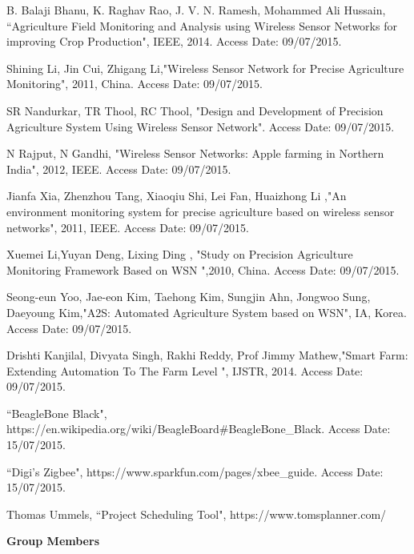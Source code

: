 \documentclass[10pt,a4paper]{article}
\begin{document}
\newpage
\begin{thebibliography}{2}

 B. Balaji Bhanu, K. Raghav Rao, J. V. N. Ramesh, Mohammed Ali Hussain, ``Agriculture Field Monitoring and Analysis using Wireless Sensor Networks for improving Crop Production", IEEE, 2014. Access Date: 09/07/2015.

 Shining Li, Jin Cui,  Zhigang Li,"Wireless Sensor Network for Precise Agriculture Monitoring", 2011, China. Access Date: 09/07/2015.

SR Nandurkar, TR Thool, RC Thool, "Design and Development of Precision Agriculture System Using Wireless Sensor Network". Access Date: 09/07/2015.


N Rajput, N Gandhi, "Wireless Sensor Networks: Apple farming in Northern India", 2012, IEEE. Access Date: 09/07/2015.

Jianfa Xia, Zhenzhou Tang, Xiaoqiu Shi, Lei Fan, Huaizhong Li ,"An environment monitoring system for 
precise agriculture based on wireless sensor networks", 2011, IEEE. Access Date: 09/07/2015.

 Xuemei Li,Yuyan Deng, Lixing Ding , "Study on Precision Agriculture Monitoring Framework Based on WSN 
",2010, China. Access Date: 09/07/2015.

 Seong-eun Yoo, Jae-eon Kim, Taehong Kim, Sungjin Ahn, Jongwoo Sung, Daeyoung Kim,"A2S: Automated 
Agriculture System based on WSN", IA, Korea. Access Date: 09/07/2015.

 Drishti Kanjilal, Divyata Singh, Rakhi Reddy, Prof Jimmy Mathew,"Smart Farm: Extending Automation To 
The Farm Level ", IJSTR, 2014. Access Date: 09/07/2015.

 ``BeagleBone Black", https://en.wikipedia.org/wiki/BeagleBoard\#BeagleBone\_Black. Access Date: 15/07/2015.

 ``Digi's Zigbee", https://www.sparkfun.com/pages/xbee\_guide. Access Date: 15/07/2015.

 Thomas Ummels, ``Project Scheduling Tool",  https://www.tomsplanner.com/
 
\end{thebibliography}


\newpage

\begin{Large}
\textbf{Group Members}
\end{Large}
\end{document}
